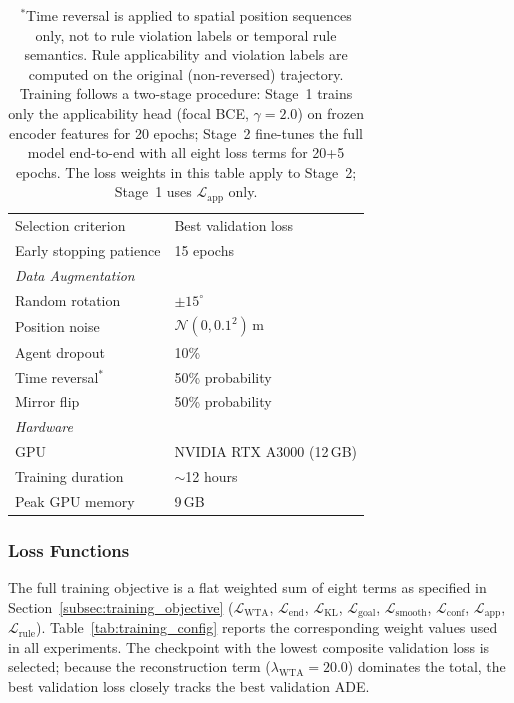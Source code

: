\begin{table}[t]
\begin{tabular}{ll}
Selection criterion & Best validation loss \\
Early stopping patience & 15 epochs \\
\midrule
\multicolumn{2}{l}{\textit{Data Augmentation}} \\
Random rotation & $\pm 15^\circ$ \\
Position noise & $\mathcal{N}(0, 0.1^2)$\,m \\
Agent dropout & 10\% \\
Time reversal$^*$ & 50\% probability \\
Mirror flip & 50\% probability \\
\midrule
\multicolumn{2}{l}{\textit{Hardware}} \\
GPU & NVIDIA RTX A3000 (12\,GB) \\
Training duration & $\sim$12 hours \\
Peak GPU memory & 9\,GB \\
\bottomrule
\end{tabular}
\vspace{1mm}
\caption*{\footnotesize $^*$Time reversal is applied to spatial position sequences only, not to rule violation labels or temporal rule semantics. Rule applicability and violation labels are computed on the original (non-reversed) trajectory.  Training follows a two-stage procedure: Stage~1 trains only the applicability head (focal BCE, $\gamma{=}2.0$) on frozen encoder features for 20 epochs; Stage~2 fine-tunes the full model end-to-end with all eight loss terms for 20+5 epochs.  The loss weights in this table apply to Stage~2; Stage~1 uses $\mathcal{L}_{\text{app}}$ only.}
\end{table}

\subsubsection{Loss Functions}

The full training objective is a flat weighted sum of eight terms as specified in Section~\ref{subsec:training_objective}
($\mathcal{L}_{\text{WTA}}$, $\mathcal{L}_{\text{end}}$,
$\mathcal{L}_{\text{KL}}$, $\mathcal{L}_{\text{goal}}$,
$\mathcal{L}_{\text{smooth}}$, $\mathcal{L}_{\text{conf}}$,
$\mathcal{L}_{\text{app}}$, $\mathcal{L}_{\text{rule}}$).
Table~\ref{tab:training_config} reports the corresponding weight values used in all experiments.  The checkpoint with the lowest composite validation loss is selected; because the reconstruction term ($\lambda_{\text{WTA}}{=}20.0$) dominates the total, the best validation loss closely tracks the best validation ADE.

